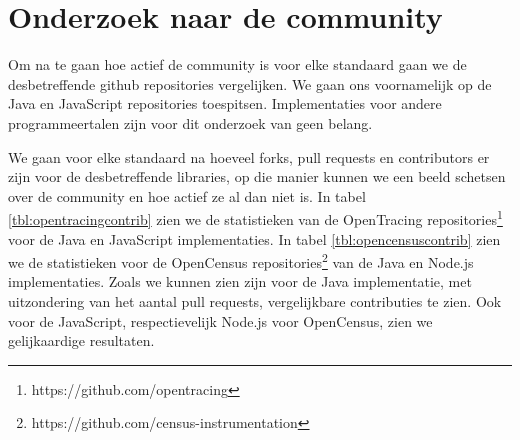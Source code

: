 \section{Onderzoek naar de community}
Om na te gaan hoe actief de community is voor elke standaard gaan we de desbetreffende github repositories vergelijken. We gaan ons voornamelijk op de Java en JavaScript repositories toespitsen. Implementaties voor andere programmeertalen zijn voor dit onderzoek van geen belang.

We gaan voor elke standaard na hoeveel forks, pull requests en contributors er zijn voor de desbetreffende libraries, op die manier kunnen we een beeld schetsen over de community en hoe actief ze al dan niet is. In tabel \ref{tbl:opentracingcontrib} zien we de statistieken van de OpenTracing repositories\footnote{https://github.com/opentracing} voor de Java en JavaScript implementaties. In tabel \ref{tbl:opencensuscontrib} zien we de statistieken voor de OpenCensus repositories\footnote{https://github.com/census-instrumentation} van de Java en Node.js implementaties. Zoals we kunnen zien zijn voor de Java implementatie, met uitzondering van het aantal pull requests, vergelijkbare contributies te zien. Ook voor de JavaScript, respectievelijk Node.js voor OpenCensus, zien we gelijkaardige resultaten.

